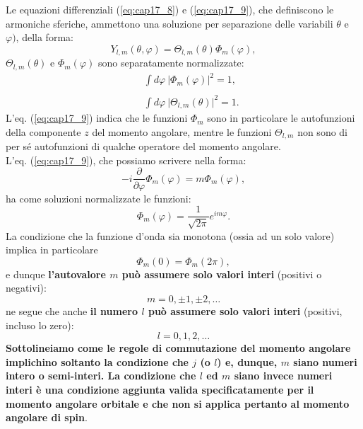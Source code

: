 Le equazioni differenziali (\ref{eq:cap17_8}) e (\ref{eq:cap17_9}), che definiscono le armoniche sferiche, ammettono una soluzione per separazione delle variabili $\theta$ e $\varphi)$, della forma:
\begin{equation}
Y_{l,m} (\theta , \varphi ) = \Theta _{l,m}(\theta)\Phi _m (\varphi) ,
\end{equation} $\Theta _{l,m}(\theta)$ e $\Phi _m (\varphi)$ sono separatamente normalizzate:
\begin{eqnarray}
& & \int d\varphi\ \vert \Phi _m (\varphi)\vert ^2 =1, \nonumber\\
\\
& & \int d\varphi\ \vert \Theta _{l,m}(\theta) \vert ^2 =1. \nonumber
\end{eqnarray}
L'eq. (\ref{eq:cap17_9}) indica che le funzioni $\Phi _m$ sono in particolare le autofunzioni della componente $z$ del momento angolare, mentre le funzioni $\Theta _{l,m}$ non sono di per sé autofunzioni di qualche operatore del momento angolare.\\
L'eq. (\ref{eq:cap17_9}), che possiamo scrivere nella forma:
\begin{equation}
-i\frac{\partial}{\partial \varphi}\Phi _m (\varphi )= m \Phi _m (\varphi ) ,
\end{equation}
ha come soluzioni normalizzate le funzioni:
\begin{equation}
\Phi _m (\varphi ) = \frac{1}{\sqrt{2\pi}}e^{im\varphi} .
\end{equation}
La condizione che la funzione d'onda sia monotona (ossia ad un solo valore) implica in particolare
\begin{equation}
\Phi _m (0) =\Phi _m (2\pi ) ,
\label{eq:cap17_10}
\end{equation}
e dunque \textbf{l'autovalore $m$ può assumere solo valori interi} (positivi o negativi):
\begin{equation}
m= 0, \pm 1,\pm 2, \dots
\end{equation}
ne segue che anche \textbf{il numero $l$ può assumere solo valori interi} (positivi, incluso lo zero):
\begin{equation}
l= 0,1,2,\dots
\end{equation}
\textbf{Sottolineiamo come le regole di commutazione del momento angolare implichino soltanto la condizione che $j$ (o $l$) e, dunque, $m$  siano numeri intero o semi-interi. La condizione che $l$ ed $m$ siano invece numeri interi è una condizione aggiunta valida specificatamente per il momento angolare orbitale e che non si applica pertanto al momento angolare di spin}.\\
